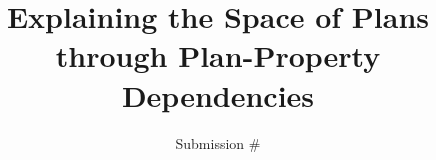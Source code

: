 \documentclass[letterpaper]{article}
\begin{document}
\nocopyright

\title{Explaining the Space of Plans through Plan-Property Dependencies}

\author{Submission \#
}

\maketitle

\begin{abstract}
\end{abstract}













\medskip

\noindent

%
%
\end{document}
